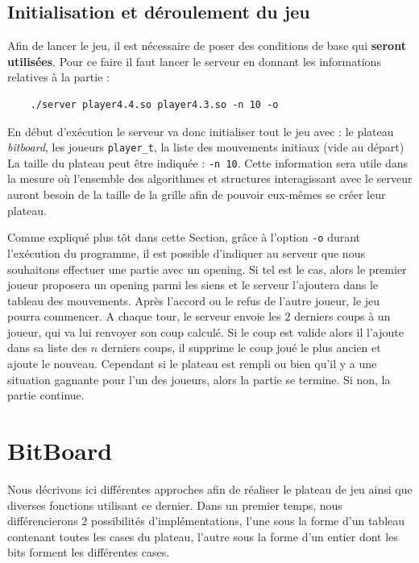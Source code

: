\documentclass[a4paper,11pt]{article}
\newcommand{\inlinecode}[2]{\colorbox{white}{\lstinline[language=#1]$#2$}}
\begin{document}

\subsection{Initialisation et déroulement du jeu}
\label{subsct:init_game}

Afin de lancer le jeu, il est nécessaire de poser des conditions de base qui \textbf{seront utilisées}.
Pour ce faire il faut lancer le serveur en donnant les informations relatives à la partie :
\begin{verbatim}
    ./server player4.4.so player4.3.so -n 10 -o
\end{verbatim}

En début d'exécution le serveur va donc initialiser tout le jeu avec : le plateau \textit{bitboard}, les joueurs \inlinecode{C}{player_t}, la liste des mouvements initiaux (vide au départ)
La taille du plateau peut être indiquée : \verb+-n 10+. Cette information sera  utile dans la mesure où l'ensemble des algorithmes et structures interagissant avec le serveur auront besoin de la taille de la grille afin de pouvoir eux-mêmes se créer leur plateau.

Comme expliqué plus tôt dans cette Section, grâce à l'option \verb+-o+ durant l'exécution du programme, il est possible d'indiquer au serveur que nous souhaitons effectuer une partie avec un opening. Si tel est le cas, alors le premier joueur proposera un opening parmi les siens et le serveur l'ajoutera dans le tableau des mouvements. Après l'accord ou le refus de l'autre joueur, le jeu pourra commencer.
A chaque tour, le serveur envoie les $2$ derniers coups à un joueur, qui va lui renvoyer son coup calculé. Si le coup est valide alors il l'ajoute dans sa liste des $n$ derniers coups, il supprime le coup joué le plus ancien et ajoute le nouveau. Cependant si le plateau est rempli ou bien qu'il y a une situation gagnante pour l'un des joueurs, alors la partie se termine. Si non, la partie continue.


\section{BitBoard}
\label{sct:bitboard}

Nous décrivons ici différentes approches afin de réaliser le plateau de jeu ainsi que diverses fonctions utilisant ce dernier. Dans un premier temps, nous différencierons $2$ possibilités d'implémentations, l'une sous la forme d'un tableau contenant toutes les cases du plateau, l'autre sous la forme d'un entier dont les bits forment les différentes cases.
\end{document}
